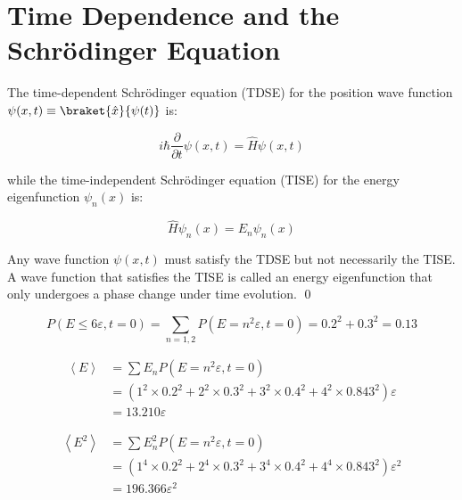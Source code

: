 \documentclass[12pt]{article}
\begin{document}



\pagebreak
\section*{Time Dependence and the Schr\"odinger Equation}


The time-dependent Schr\"odinger equation (TDSE) for the position wave function $\psi(x,t) \equiv \braket{\hat{x}}{\psi(t)}$ is:

\begin{equation}
    i\hbar \frac{\partial}{\partial t} \psi(x,t) = \hat{H} \psi(x,t)
\end{equation}

while the time-independent Schr\"odinger equation (TISE) for the energy eigenfunction $\psi_{n}(x)$ is:

\begin{equation}
    \hat{H} \psi_{n}(x) = E_{n} \psi_{n}(x)
\end{equation}

Any wave function $\psi(x,t)$ must satisfy the TDSE but not necessarily the TISE. A wave function that satisfies the TISE is called an energy eigenfunction that only undergoes a phase change under time evolution.
\qed






\begin{equation}
    P(E \le 6\varepsilon, t = 0) = \sum_{n = 1, 2} P(E = n^{2}\varepsilon, t = 0) = 0.2^{2} + 0.3^{2} = 0.13
\end{equation}


\begin{equation}
    \begin{split}
        \left\langle E \right\rangle &= \sum E_{n} P(E = n^{2}\varepsilon, t = 0) \\
        &= \left( 1^{2} \times 0.2^{2} + 2^{2} \times 0.3^{2} + 3^{2} \times 0.4^{2} + 4^{2} \times 0.843^{2} \right) \varepsilon \\
        &= 13.210 \varepsilon
    \end{split}
\end{equation}

\begin{equation}
    \begin{split}
        \left\langle E^{2} \right\rangle &= \sum E_{n}^{2} P(E = n^{2}\varepsilon, t = 0) \\
        &= \left( 1^{4} \times 0.2^{2} + 2^{4} \times 0.3^{2} + 3^{4} \times 0.4^{2} + 4^{4} \times 0.843^{2} \right) \varepsilon^{2} \\
        &= 196.366 \varepsilon^{2}
    \end{split}
\end{equation}
\end{document}
